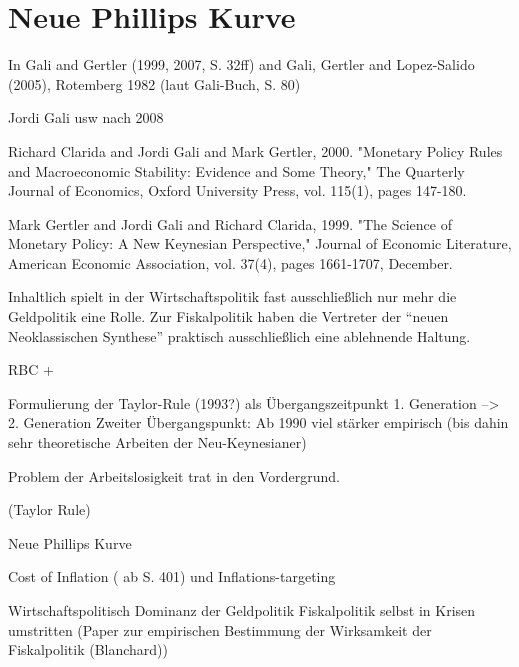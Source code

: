 \section{Neue Phillips Kurve}
\label{NeuePhillips}

In Gali and Gertler (1999, 2007, S. 32ff) and Gali, Gertler and Lopez-Salido (2005),
Rotemberg 1982 (laut Gali-Buch, S. 80)


Jordi Gali usw nach 2008




Richard Clarida and Jordi Gali and Mark Gertler, 2000. "Monetary Policy Rules and Macroeconomic Stability: Evidence and Some Theory," The Quarterly Journal of Economics, Oxford University Press, vol. 115(1), pages 147-180.

Mark Gertler and Jordi Gali and Richard Clarida, 1999. "The Science of Monetary Policy: A New Keynesian Perspective," Journal of Economic Literature, American Economic Association, vol. 37(4), pages 1661-1707, December.



Inhaltlich spielt in der Wirtschaftspolitik fast ausschließlich nur mehr die Geldpolitik eine Rolle. Zur Fiskalpolitik haben die Vertreter der "`neuen Neoklassischen Synthese"' praktisch ausschließlich eine ablehnende Haltung.






















RBC + \textcite{RomerDavid1990}

Formulierung der Taylor-Rule (1993?) als  Übergangszeitpunkt 1. Generation --> 2. Generation
Zweiter Übergangspunkt: Ab 1990 viel stärker empirisch (bis dahin sehr theoretische Arbeiten der Neu-Keynesianer)

Problem der Arbeitslosigkeit trat in den Vordergrund.


(Taylor Rule)

Neue Phillips Kurve

Cost of Inflation (\textcite{Snowdon2005} ab S. 401) und Inflations-targeting


Wirtschaftspolitisch Dominanz der Geldpolitik
Fiskalpolitik selbst in Krisen umstritten (Paper zur empirischen Bestimmung der Wirksamkeit der Fiskalpolitik (Blanchard))



